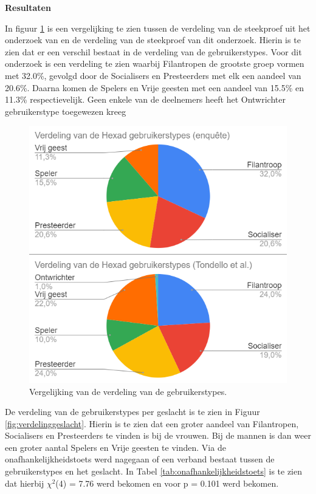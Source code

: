 \textbf{Resultaten}

In figuur \ref{fig:vergelijkingonderzoek} is een vergelijking te zien tussen de verdeling van de steekproef uit het onderzoek van \textcite{Tondello2016} en de verdeling van de steekproef van dit onderzoek. Hierin is te zien dat er een verschil bestaat in de verdeling van de gebruikerstypes. Voor dit onderzoek is een verdeling te zien waarbij Filantropen de grootste groep vormen met 32.0\%, gevolgd door de Socialisers en Presteerders met elk een aandeel van 20.6\%. Daarna komen de Spelers en Vrije geesten met een aandeel van 15.5\% en 11.3\% respectievelijk. Geen enkele van de deelnemers heeft het Ontwrichter gebruikerstype toegewezen kreeg

\begin{figure}
    \includegraphics[width=\linewidth]{VergelijkingOnderzoek.png}
    \caption{Vergelijking van de verdeling van de gebruikerstypes.}
    \label{fig:vergelijkingonderzoek}
\end{figure}

De verdeling van de gebruikerstypes per geslacht is te zien in Figuur \ref{fig:verdelinggeslacht}. Hierin is te zien dat een groter aandeel van Filantropen, Socialisers en Presteerders te vinden is bij de vrouwen. Bij de mannen is dan weer een groter aantal Spelers en Vrije geesten te vinden. Via de onafhankelijkheidstoets werd nagegaan of een verband bestaat tussen de gebruikerstypes en het geslacht. In Tabel \ref{tab:onafhankelijkheidstoets} is te zien dat hierbij $\chi^2$(4) = 7.76 werd bekomen en voor p = 0.101 werd bekomen.

